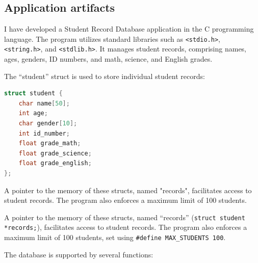 \documentclass[a4paper, 11pt]{report}
\begin{document}
\subsection{Application artifacts}
I have developed a Student Record Database application in the C programming language. The program utilizes standard libraries such as \texttt{<stdio.h>}, \texttt{<string.h>}, and \texttt{<stdlib.h>}. It manages student records, comprising names, ages, genders, ID numbers, and math, science, and English grades.

The ``student'' struct is used to store individual student records:

\begin{lstlisting}[language=C]
struct student {
    char name[50];
    int age;
    char gender[10];
    int id_number;
    float grade_math;
    float grade_science;
    float grade_english;
};
\end{lstlisting}

A pointer to the memory of these structs, named "records", facilitates access to student records. The program also enforces a maximum limit of 100 students.

A pointer to the memory of these structs, named ``records'' (\texttt{struct student *records;}), facilitates access to student records. The program also enforces a maximum limit of 100 students, set using \texttt{\#define MAX\_STUDENTS 100}.

The database is supported by several functions:
\end{document}
